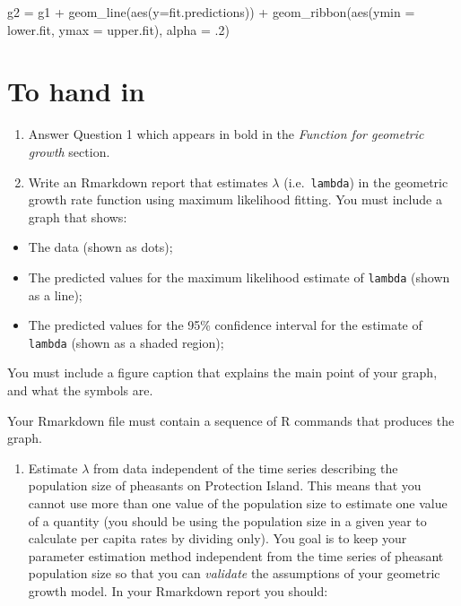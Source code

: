 \documentclass[
]{book}
\newenvironment{Shaded}{\begin{snugshade}}{\end{snugshade}}
\newcommand{\AttributeTok}[1]{\textcolor[rgb]{0.77,0.63,0.00}{#1}}
\newcommand{\DecValTok}[1]{\textcolor[rgb]{0.00,0.00,0.81}{#1}}
\newcommand{\FunctionTok}[1]{\textcolor[rgb]{0.00,0.00,0.00}{#1}}
\newcommand{\NormalTok}[1]{#1}
\newcommand{\OtherTok}[1]{\textcolor[rgb]{0.56,0.35,0.01}{#1}}
\newcommand{\SpecialCharTok}[1]{\textcolor[rgb]{0.00,0.00,0.00}{#1}}
\providecommand{\tightlist}{%
  \setlength{\itemsep}{0pt}\setlength{\parskip}{0pt}}
\begin{document}
\begin{Shaded}
\begin{Highlighting}[]
\NormalTok{g2 }\OtherTok{=}\NormalTok{ g1 }\SpecialCharTok{+}
  \FunctionTok{geom\_line}\NormalTok{(}\FunctionTok{aes}\NormalTok{(}\AttributeTok{y=}\NormalTok{fit.predictions)) }\SpecialCharTok{+}
  \FunctionTok{geom\_ribbon}\NormalTok{(}\FunctionTok{aes}\NormalTok{(}\AttributeTok{ymin =}\NormalTok{ lower.fit, }\AttributeTok{ymax =}\NormalTok{ upper.fit), }\AttributeTok{alpha =}\NormalTok{ .}\DecValTok{2}\NormalTok{)}
\end{Highlighting}
\end{Shaded}

\hypertarget{to-hand-in}{%
\section{To hand in}\label{to-hand-in}}

\begin{enumerate}
\def\labelenumi{\arabic{enumi}.}
\item
  Answer Question 1 which appears in bold in the \emph{Function for geometric growth} section.
\item
  Write an Rmarkdown report that estimates \(\lambda\) (i.e.~\texttt{lambda}) in the geometric growth rate function using maximum likelihood fitting.
  You must include a graph that shows:
\end{enumerate}

\begin{itemize}
\tightlist
\item
  The data (shown as dots);
\item
  The predicted values for the maximum likelihood estimate of \texttt{lambda} (shown as a line);
\item
  The predicted values for the 95\% confidence interval for the estimate of \texttt{lambda} (shown as a shaded region);
\end{itemize}

You must include a figure caption that explains the main point of your graph, and what the symbols are.

Your Rmarkdown file must contain a sequence of R commands that produces the graph.

\begin{enumerate}
\def\labelenumi{\arabic{enumi}.}
\setcounter{enumi}{2}
\tightlist
\item
  Estimate \(\lambda\) from data independent of the time series describing the population size of pheasants on Protection Island. This means that you cannot use more than one value of the population size to estimate one value of a quantity (you should be using the population size in a given year to calculate per capita rates by dividing only). You goal is to keep your parameter estimation method independent from the time series of pheasant population size so that you can \emph{validate} the assumptions of your geometric growth model. In your Rmarkdown report you should:
\end{enumerate}
\end{document}
